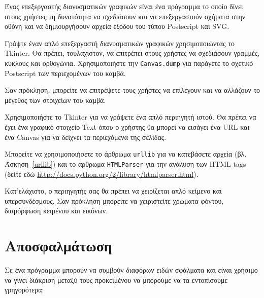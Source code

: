 \documentclass[10pt]{book}
\begin{document}
\begin{exercise}

Ένας επεξεργαστής διανυσματικών γραφικών είναι ένα πρόγραμμα το οποίο δίνει στους χρήστες τη δυνατότητα
να σχεδιάσουν και να επεξεργαστούν σχήματα στην οθόνη και να δημιουργήσουν αρχεία εξόδου του τύπου Postscript και SVG.

Γράψτε έναν απλό επεξεργαστή διανυσματικών γραφικών χρησιμοποιώντας το Tkinter. Θα πρέπει, τουλάχιστον, να επιτρέπει
στους χρήστες να σχεδιάσουν γραμμές, κύκλους και ορθογώνια.  Χρησιμοποιήστε την {\tt Canvas.dump} για παράγετε το
σχετικό Postscript των περιεχομένων του καμβά.

Σαν πρόκληση, μπορείτε να επιτρέψετε τους χρήστες να επιλέγουν και να αλλάζουν το μέγεθος 
των στοιχείων του καμβά. 
\\

\end{exercise}



\begin{exercise}

Χρησιμοποιήστε το Tkinter για να γράψετε ένα απλό περιηγητή ιστού.  Θα πρέπει να 
έχει ένα γραφικό στοιχείο Text όπου ο χρήστης θα μπορεί να εισάγει ένα URL και 
ένα Canvas για να δείχνει τα περιεχόμενα της σελίδας.

Μπορείτε να χρησιμοποιήσετε το άρθρωμα {\tt urllib} για να κατεβάσετε αρχεία (βλ. Άσκηση~\ref{urllib}) και το
άρθρωμα {\tt HTMLParser} για την ανάλυση των HTML tags (δείτε εδώ \url{http://docs.python.org/2/library/htmlparser.html}).

Κατ'ελάχιστο, ο περιηγητής σας θα πρέπει να χειρίζεται απλό κείμενο και υπερσυνδέσμους.  Σαν πρόκληση μπορείτε
να χειριστείτε χρώματα φόντου, διαμόρφωση κειμένου και εικόνων.

\end{exercise}




\appendix

\chapter{Αποσφαλμάτωση}

Σε ένα πρόγραμμα μπορούν να συμβούν διαφόρων ειδών σφάλματα και είναι χρήσιμο 
να γίνει διάκριση μεταξύ τους προκειμένου να μπορούμε να τα εντοπίσουμε γρηγορότερα:
\end{document}
